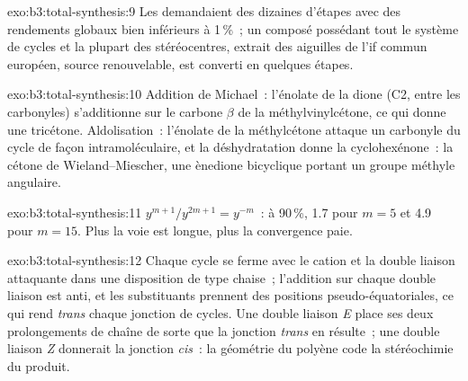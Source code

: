 \begin{solution}{exo:b3:total-synthesis:9}
Les  demandaient des dizaines d'étapes avec des
rendements globaux bien inférieurs à 1\,\%~; un composé possédant tout le
système de cycles et la plupart des stéréocentres, extrait des aiguilles
de l'if commun européen, source renouvelable, est converti en quelques
étapes.
\end{solution}

\begin{solution}{exo:b3:total-synthesis:10}
Addition de Michael~: l'énolate de la dione (C2, entre les carbonyles)
s'additionne sur le carbone $\beta$ de la méthylvinylcétone, ce qui donne une tricétone. Aldolisation~: l'énolate de la
méthylcétone attaque un carbonyle du cycle de façon intramoléculaire, et la
déshydratation donne la cyclohexénone~: la cétone de Wieland--Miescher, une
ènedione bicyclique portant un groupe méthyle angulaire.
\end{solution}

\begin{solution}{exo:b3:total-synthesis:11}
$y^{m+1}/y^{2m+1} = y^{-m}$~: à 90\,\%, 1.7 pour $m = 5$ et 4.9 pour $m = 15$. Plus la voie est longue, plus la
convergence paie.
\end{solution}

\begin{solution}{exo:b3:total-synthesis:12}
Chaque cycle se ferme avec le cation et la double liaison attaquante dans
une disposition de type chaise~; l'addition sur chaque double liaison est
anti, et les substituants prennent des positions pseudo-équatoriales, ce
qui rend \textit{trans} chaque jonction de cycles. Une double liaison \textit{E}
place ses deux prolongements de chaîne de sorte que la jonction \textit{trans} en résulte~; une double liaison \textit{Z}
donnerait la jonction \textit{cis}~: la géométrie du polyène code la
stéréochimie du produit.
\end{solution}

